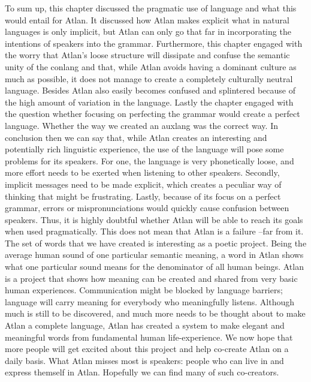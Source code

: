 To sum up, this chapter discussed the pragmatic use of language and what this would entail for Atlan. It discussed how Atlan makes explicit what in natural languages is only implicit, but Atlan can only go that far in incorporating the intentions of speakers into the grammar. Furthermore, this chapter engaged with the worry that Atlan’s loose structure will dissipate and confuse the semantic unity of the conlang and that, while Atlan avoids having a dominant culture as much as possible, it does not manage to create a completely culturally neutral language. Besides Atlan also easily becomes confused and splintered because of the high amount of variation in the language. Lastly the chapter engaged with the question whether focusing on perfecting the grammar would create a perfect language. Whether the way we created an auxlang  was the correct way. In conclusion then we can say that, while Atlan creates an interesting and potentially rich linguistic experience, the use of the language will pose some problems for its speakers. For one, the language is very phonetically loose, and more effort needs to be exerted when listening to other speakers. Secondly, implicit messages need to be made explicit, which creates a peculiar way of thinking that might be frustrating. Lastly, because of its focus on a perfect grammar, errors or mispronunciations would quickly cause confusion between speakers. Thus, it is highly doubtful whether Atlan will be able to reach its goals when used pragmatically.  This does not mean that Atlan is  a failure --far from it. The set of words that we have created is interesting as a poetic project. Being the average human sound of one particular semantic meaning, a word in Atlan shows what one particular sound means for the denominator of all human beings. Atlan is a project that shows how meaning can be created and shared from very basic human experiences.  Communication might be blocked by language barriers; language will carry meaning for everybody who meaningfully listens. Although much is still to be discovered, and much more needs to be thought about to make Atlan a complete language, Atlan has created a system to make elegant and meaningful words from fundamental human life-experience. We now hope that more people will get excited about this project and help co-create Atlan on a daily basis. What Atlan misses most is speakers: people who can live in and express themself in Atlan. Hopefully we can find many of such co-creators.

